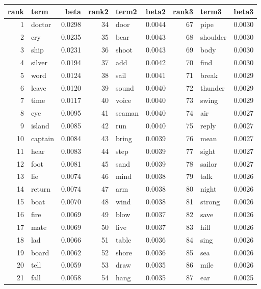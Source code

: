 \begin{table}[ht]
\centering
\begin{tabular}{rlrrlrrlr}
  \hline
rank & term & beta & rank2 & term2 & beta2 & rank3 & term3 & beta3 \\ 
  \hline
1 & doctor & 0.0298 & 34 & door & 0.0044 & 67 & pipe & 0.0030 \\ 
  2 & cry & 0.0235 & 35 & bear & 0.0043 & 68 & shoulder & 0.0030 \\ 
  3 & ship & 0.0231 & 36 & shoot & 0.0043 & 69 & body & 0.0030 \\ 
  4 & silver & 0.0194 & 37 & add & 0.0042 & 70 & find & 0.0030 \\ 
  5 & word & 0.0124 & 38 & sail & 0.0041 & 71 & break & 0.0029 \\ 
  6 & leave & 0.0120 & 39 & sound & 0.0040 & 72 & thunder & 0.0029 \\ 
  7 & time & 0.0117 & 40 & voice & 0.0040 & 73 & swing & 0.0029 \\ 
  8 & eye & 0.0095 & 41 & seaman & 0.0040 & 74 & air & 0.0027 \\ 
  9 & island & 0.0085 & 42 & run & 0.0040 & 75 & reply & 0.0027 \\ 
  10 & captain & 0.0084 & 43 & bring & 0.0039 & 76 & mean & 0.0027 \\ 
  11 & hear & 0.0083 & 44 & step & 0.0039 & 77 & sight & 0.0027 \\ 
  12 & foot & 0.0081 & 45 & sand & 0.0039 & 78 & sailor & 0.0027 \\ 
  13 & lie & 0.0074 & 46 & mind & 0.0038 & 79 & talk & 0.0026 \\ 
  14 & return & 0.0074 & 47 & arm & 0.0038 & 80 & night & 0.0026 \\ 
  15 & boat & 0.0070 & 48 & wind & 0.0038 & 81 & strong & 0.0026 \\ 
  16 & fire & 0.0069 & 49 & blow & 0.0037 & 82 & save & 0.0026 \\ 
  17 & mate & 0.0069 & 50 & live & 0.0037 & 83 & hill & 0.0026 \\ 
  18 & lad & 0.0066 & 51 & table & 0.0036 & 84 & sing & 0.0026 \\ 
  19 & board & 0.0062 & 52 & shore & 0.0036 & 85 & sea & 0.0026 \\ 
  20 & tell & 0.0059 & 53 & draw & 0.0035 & 86 & mile & 0.0026 \\ 
  21 & fall & 0.0058 & 54 & hang & 0.0035 & 87 & ear & 0.0025 \\ 

\end{tabular}
\end{table}

